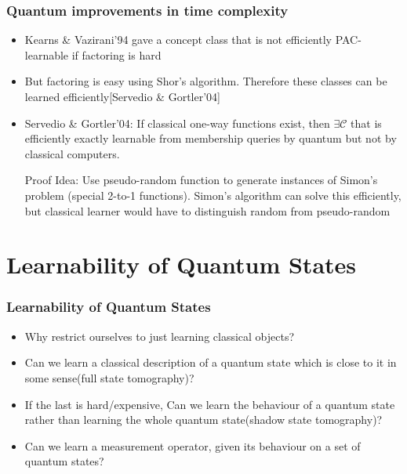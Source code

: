 \documentclass{beamer}
\begin{document}
\begin{frame}
\frametitle{Quantum improvements in time complexity}
    \begin{itemize}
        \item Kearns \& Vazirani’94 gave a concept class 
        that is not efficiently PAC-learnable if factoring is hard

        \item But factoring is easy using Shor's algorithm. Therefore
        these classes can be learned efficiently[Servedio \&
        Gortler’04]

        \item Servedio \& Gortler’04: If classical one-way functions exist,
        then $\exists \mathcal{C}$ that is efficiently exactly learnable from membership
        queries by quantum but not by classical computers.
        
        Proof Idea: Use pseudo-random function to generate instances
        of Simon’s problem (special 2-to-1 functions). Simon’s
        algorithm can solve this efficiently, but classical learner would
        have to distinguish random from pseudo-random
    \end{itemize}
\end{frame}

\section{Learnability of Quantum States}
\begin{frame}
    \frametitle{Learnability of Quantum States}
        \begin{itemize}
    
            \item Why restrict ourselves to just learning classical objects? 
        
        \item Can we learn a classical description of a quantum state which is close to it in some sense(full state tomography)? 
        
        \item If the last is hard/expensive, Can we learn the behaviour of a quantum state rather than learning the whole quantum state(shadow state tomography)? 
    
        \item Can we learn a measurement operator, given its behaviour on a set of quantum states?
    
    
        \end{itemize}
    \end{frame}
    
\end{document}
